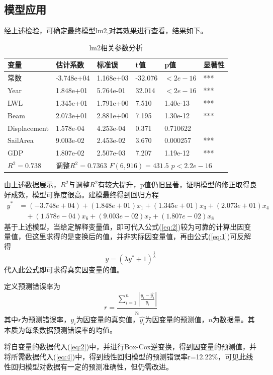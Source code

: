 \documentclass[a4paper,12pt,onecolumn,oneside]{article}
\begin{document}
\subsection{模型应用}
经上述检验，可确定最终模型lm2,对其效果进行查看，结果如下。
\begin{table}[htbp]
	\centering
	\caption{lm2相关参数分析}\vspace{0.5\baselineskip}
	\begin{tabular}{llllll}
		\toprule
		变量 & 估计系数 & 标准误 & t值 & p值 & 显著性 \\
		\midrule
		常数 & -3.748e+04 & 1.168e+03 & -32.076 & $< 2e-16$ & *** \\
		Year & 1.848e+01 & 5.764e-01 & 32.014 & $< 2e-16$ & *** \\
		LWL & 1.345e+01 & 1.791e+00 & 7.510 & 1.40e-13 & *** \\
		Beam & 2.073e+01 & 2.881e+00 & 7.195 & 1.30e-12 & *** \\
		Displacement & 1.578e-04 & 4.253e-04 & 0.371 & 0.710622 & \\
		SailArea & 9.003e-02 & 2.453e-02 & 3.670 & 0.000257 & *** \\
		GDP & 1.807e-02 & 2.507e-03 & 7.207 & 1.19e-12 & *** \\
		\midrule
		$R^2=0.738$ & \multicolumn{5}{l}{调整$R^2=0.7363$ $F(6,916)=431.5$ $p<2.2e-16$} \\
		\bottomrule
	\end{tabular}%
	\label{tab:lm2}%
\end{table}
由上述数据展示，$R^2$与调整$R^2$有较大提升，p值仍旧显著，证明模型的修正取得良好成效，模型可靠度很高。建模最终得到回归方程
\begin{align}\label{eq:2}
	y^{*} &= (-3.748e+04) + (1.848e+01) x_1 + (1.345e+01) x_3 + (2.073e+01) x_4 \nonumber \\
	&\quad + (1.578e-04) x_6 + (9.003e-02) x_7 + (1.807e-02) x_8
\end{align}
基于上述模型，当给定解释变量值，即可代入公式(\ref{eq:2})较为可靠的计算出因变量值，但这里求得的是变换后的值，并非实际因变量值，再由公式(\ref{eq:1})可反解得
\begin{equation}
	y = (\lambda y^{*}+1)^{\frac{1}{\lambda}}
\end{equation}
代入此公式即可求得真实因变量的值。\par 
定义预测错误率为
\begin{equation}\label{eq:4}
	r = \frac{\sum_{i=1}^{n}|\frac{y_i-\hat{y_i}}{y_i}|}{n}
\end{equation}
其中$r$为预测错误率，$y_i$为因变量的真实值，$\hat{y_i}$为因变量的预测值，$n$为数据量。其本质为每条数据预测错误率的均值。\par 
将自变量的数据代入(\ref{eq:2})中，并进行Box-Cox逆变换，得到因变量的预测值，并将所需数据代入(\ref{eq:4})中，得到线性回归模型的预测错误率r=12.22\%，可见此线性回归模型对数据有一定的预测准确性，但仍需改进。
\end{document}
